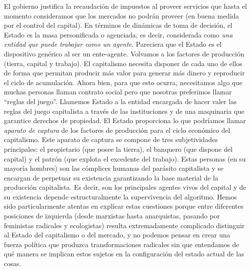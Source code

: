 El gobierno justifica la recaudación de impuestos al proveer servicios que hasta el momento consideramos que los mercados no podrán proveer (en buena medida por el control del capital). En términos de dinámicas de toma de decisión, el Estado es la masa personificada o agenciada, es decir, considerada como \emph{una entidad que puede trabajar como un agente}. Pareciera que el Estado es el dispositivo genérico al ser un ente-agente. Volvamos a los factores de producción (tierra, capital y trabajo). El capitalismo necesita disponer de cada uno de ellos de forma que permitan producir más valor para generar más dinero y reproducir el ciclo de acumulación. Ahora bien, para que esto ocurra, necesitamos algo que muchas personas llaman contrato social pero que nosotras preferimos llamar \enquote{reglas del juego}. Llamemos Estado a la entidad encargada de hacer valer las reglas del juego capitalista a través de las instituciones y de una maquinaria que garantice derechos de propiedad. El Estado proporciona lo que podríamos llamar \emph{aparato de captura} de los factores de producción para el ciclo económico del capitalismo. Este aparato de captura se compone de tres subjetividades principales: el propietario (que posee la tierra), el banquero (que dispone del capital) y el patrón (que explota el excedente del trabajo). Estas personas (en su mayoría hombres) son las cómplices humanas del parásito capitalista y se encargan de perpetuar su existencia garantizando la base material de la producción capitalista. Es decir, son los principales agentes vivos del capital y de su existencia depende estructuralmente la supervivencia del algoritmo. Hemos sido particularmente atentas en explicar estas cuestiones porque entre diferentes posiciones de izquierda (desde marxistas hasta anarquistas, pasando por feministas radicales y ecologistas) resulta extremadamente complicado distinguir al Estado del capitalismo o del mercado, y no podemos pensar en crear una fuerza política que produzca transformaciones radicales sin que entendamos de qué manera se implican estos sujetos en la configuración del estado actual de las cosas.

